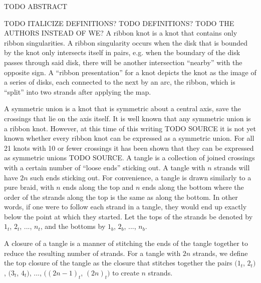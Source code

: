 

\begin{paperabstract}
TODO ABSTRACT
\end{paperabstract}
\begin{paper}
\theorems
TODO ITALICIZE DEFINITIONS?
TODO DEFINITIONS?
TODO THE AUTHORS INSTEAD OF WE?
A ribbon knot is a knot that contains only ribbon singularities.
A ribbon singularity occurs when the disk that is bounded by the knot only
intersects itself in pairs, e.g. when the boundary of the disk passes through
said disk, there will be another intersection ``nearby'' with the opposite sign.
A ``ribbon presentation'' for a knot depicts the knot as the image of a series
of disks, each connected to the next by an arc, the ribbon, which is ``split''
into two strands after applying the map.

A symmetric union is a knot that is symmetric about a central axis, save the
crossings that lie on the axis itself.
It is well known that any symmetric union is a ribbon knot.
However, at this time of this writing TODO SOURCE it is not yet known whether
every ribbon knot can be expressed as a symmetric union.
For all 21 knots with 10 or fewer crossings it has been shown that they can be
expressed as symmetric unions TODO SOURCE.
A tangle is a collection of joined crossings with a certain number of ``loose
ends'' sticking out.
A tangle with $n$ strands will have $2n$ such ends sticking out.
For convenience, a tangle is drawn similarly to a pure braid, with $n$ ends
along the top and $n$ ends along the bottom where the order of the strands along
the top is the same as along the bottom.
In other words, if one were to follow each strand in a tangle, they would end up
exactly below the point at which they started.
Let the tops of the strands be denoted by $1_t$, $2_t$, ..., $n_t$, and the
bottoms  by $1_b$, $2_b$, ..., $n_b$.


A closure of a tangle is a manner of stitching the ends of the tangle together
to reduce the resulting number of strands.
For a tangle with $2n$ strands, we define the top closure of the tangle as the
closure that stitches together the pairs
$(1_t$, $2_t)$, $(3_t$, $4_t)$, $...$, $((2n-1)_t$, $(2n)_t)$ to create $n$
strands.


\end{paper}
